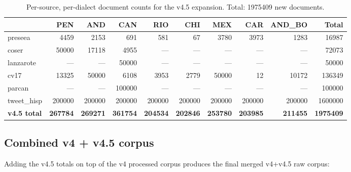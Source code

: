 \documentclass[11pt,a4paper]{article}
\begin{document}
\begin{table}[h]
\centering\small
\begin{tabular}{l r r r r r r r r r}
\toprule
 & \textbf{PEN} & \textbf{AND} & \textbf{CAN} & \textbf{RIO} & \textbf{CHI} & \textbf{MEX} & \textbf{CAR} & \textbf{AND\_BO} & \textbf{Total} \\
\midrule
preseea    & \num{4459}   & \num{2153}   & \num{691}    & \num{581}    & \num{67}     & \num{3780}   & \num{3973}   & \num{1283}   & \num{16987}    \\
coser      & \num{50000}  & \num{17118}  & \num{4955}   & ---          & ---          & ---          & ---          & ---          & \num{72073}    \\
lanzarote  & ---          & ---          & \num{50000}  & ---          & ---          & ---          & ---          & ---          & \num{50000}    \\
cv17       & \num{13325}  & \num{50000}  & \num{6108}   & \num{3953}   & \num{2779}   & \num{50000}  & \num{12}     & \num{10172}  & \num{136349}   \\
parcan     & ---          & ---          & \num{100000} & ---          & ---          & ---          & ---          & ---          & \num{100000}   \\
tweet\_hisp & \num{200000} & \num{200000} & \num{200000} & \num{200000} & \num{200000} & \num{200000} & \num{200000} & \num{200000} & \num{1600000}  \\
\midrule
\textbf{v4.5 total} & \textbf{\num{267784}} & \textbf{\num{269271}} & \textbf{\num{361754}} & \textbf{\num{204534}} & \textbf{\num{202846}} & \textbf{\num{253780}} & \textbf{\num{203985}} & \textbf{\num{211455}} & \textbf{\num{1975409}} \\
\bottomrule
\end{tabular}
\caption{Per-source, per-dialect document counts for the v4.5 expansion.
Total: \num{1975409} new documents.}
\label{tab:v45-grand}
\end{table}

\subsection{Combined v4 + v4.5 corpus}

Adding the v4.5 totals on top of the v4 processed corpus produces the
final merged v4+v4.5 raw corpus:
\end{document}
